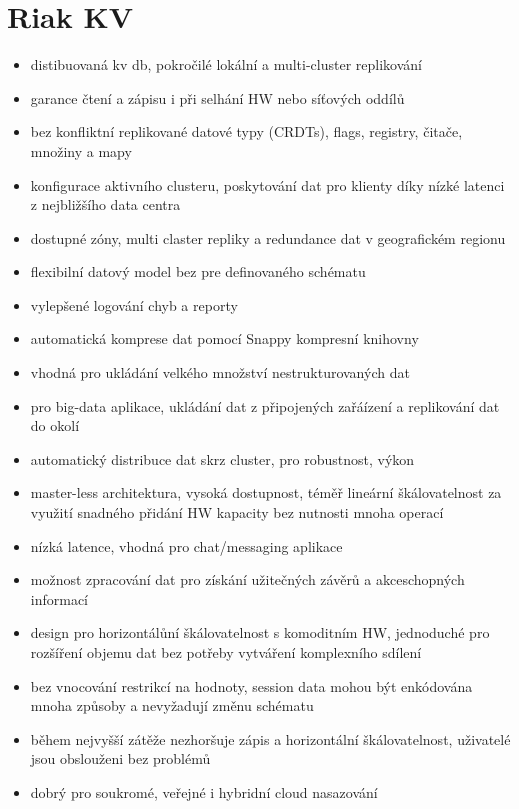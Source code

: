 \documentclass[czech,bachelor,dept460,male,csharp,cpdeclaration]{diploma}
\begin{document}
		\section{Riak KV}
			\begin{itemize}
				\item distibuovaná kv db, pokročilé lokální a multi-cluster replikování
				\item garance čtení a zápisu i při selhání HW nebo síťových oddílů
				\item bez konfliktní replikované datové typy (CRDTs), flags, registry, čitače, množiny a mapy
				\item konfigurace aktivního clusteru, poskytování dat pro klienty díky nízké latenci z nejbližšího data centra
				\item dostupné zóny, multi claster repliky a redundance dat v geografickém regionu
				\item flexibilní datový model bez pre definovaného schématu
				\item vylepšené logování chyb a reporty
				\item automatická komprese dat pomocí Snappy kompresní knihovny
				\item vhodná pro ukládání velkého množství nestrukturovaných dat
				\item pro big-data aplikace, ukládání dat z připojených zařáízení a replikování dat do okolí
				\item automatický distribuce dat skrz cluster, pro robustnost, výkon
				\item master-less architektura, vysoká dostupnost, téměř lineární škálovatelnost za využití snadného přidání HW kapacity bez nutnosti mnoha operací
				\item nízká latence, vhodná pro chat/messaging aplikace
				\item možnost zpracování dat pro získání užitečných závěrů a akceschopných informací
				\item design pro horizontálůní škálovatelnost s komoditním HW, jednoduché pro rozšíření objemu dat bez potřeby vytváření komplexního sdílení
				\item bez vnocování restrikcí na hodnoty, session data mohou být enkódována mnoha způsoby a nevyžadují změnu schématu
				\item během nejvyšší zátěže nezhoršuje zápis a horizontální škálovatelnost, uživatelé jsou obslouženi bez problémů
				\item dobrý pro soukromé, veřejné i hybridní cloud nasazování
			\end{itemize}
		 
\end{document}

